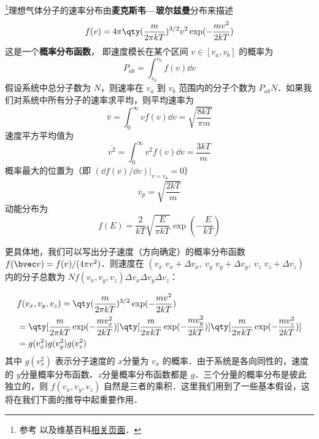 
\begin{issues}
\issueDraft
\end{issues}

\footnote{参考 \cite{新热} 以及维基百科\href{https://en.wikipedia.org/wiki/Maxwell-Boltzmann_distribution}{相关页面}．}理想气体分子的速率分布由\textbf{麦克斯韦—玻尔兹曼}分布来描述
\begin{equation}
f(v) = 4\pi \qty(\frac{m}{2\pi kT})^{3/2} v^2 \exp(-\frac{mv^2}{2kT})
\end{equation}
这是一个\textbf{概率分布函数}， 即速度模长在某个区间 $v \in [v_a, v_b]$ 的概率为
\begin{equation}
P_{ab} = \int_{v_a}^{v_b} f(v) \dd{v}
\end{equation}
假设系统中总分子数为 $N$，则速率在 $v_a$ 到 $v_b$ 范围内的分子个数为 $P_{ab}N$．如果我们对系统中所有分子的速率求平均，则平均速率为
\begin{equation}
\bar v = \int_{0}^\infty v f(v)\dd v= \sqrt{\frac{8kT}{\pi m}}
\end{equation}
速度平方平均值为
\begin{equation}\label{MxwBzm_eq1}
\overline {v^2} = \int_{0}^\infty v^2 f(v)\dd v = \frac{3kT}{m}
\end{equation}
概率最大的位置为（即 $(\dd f(v)/\dd v)|_{v=v_p}=0$）
\begin{equation}
v_p =\sqrt{\frac{2kT}{m}}
\end{equation}
动能分布为
\begin{equation}
f(E) = \frac{2}{kT}\sqrt{\frac{E}{\pi kT}} \exp(-\frac{E}{kT})
\end{equation}

更具体地，我们可以写出分子速度（方向确定）的概率分布函数 $f(\bvec v)=f(v)/(4\pi v^2)$．则速度在 $(v_x\text{~}v_x+\Delta v_x,\ v_y\text{~}v_y+\Delta v_y,\ v_z\text{~}v_z+\Delta v_z)$ 内的分子总数为 $N f(v_x,v_y,v_z)\Delta v_x\Delta v_y\Delta v_z$：

\begin{equation}
\begin{aligned}
&f(v_x,v_y,v_z)=\qty(\frac{m}{2\pi k T})^{3/2}\exp(-\frac{mv^2}{2kT})\\
&=\qty[\frac{m}{2\pi kT}\exp(-\frac{mv_x^2}{2kT})]\qty[\frac{m}{2\pi kT}\exp(-\frac{mv_y^2}{2kT})]\qty[\frac{m}{2\pi kT}\exp(-\frac{mv_z^2}{2kT})]\\
&=g(v_x^2)g(v_y^2)g(v_z^2)
\end{aligned}
\end{equation}
其中 $g(v_x^2)$ 表示分子速度的 $x$分量为 $v_x$ 的概率．由于系统是各向同性的，速度的 $y$分量概率分布函数、$z$分量概率分布函数都是 $g$．三个分量的概率分布是彼此独立的，则 $f(v_x,v_y,v_z)$ 自然是三者的乘积．这里我们用到了一些基本假设，这将在我们下面的推导中起重要作用．

